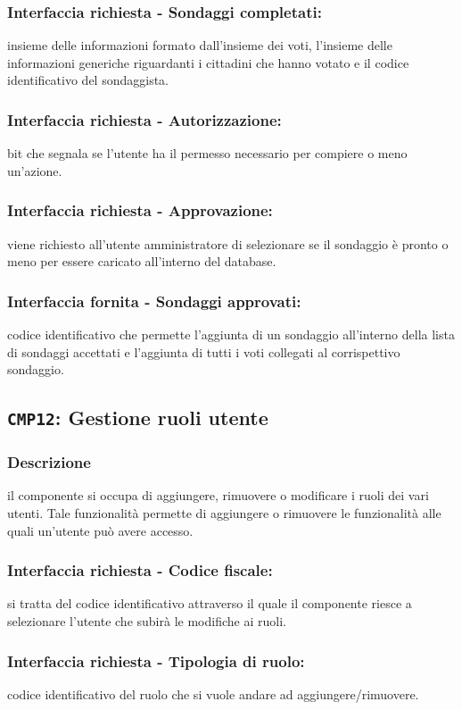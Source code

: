         \subsubsection{Interfaccia richiesta - Sondaggi completati:}
            insieme delle informazioni formato dall'insieme dei voti, l'insieme delle informazioni generiche riguardanti i cittadini che hanno votato e il codice identificativo del sondaggista.
        \subsubsection{Interfaccia richiesta - Autorizzazione:}
            bit che segnala se l'utente ha il permesso necessario per compiere o meno un'azione.
        \subsubsection{Interfaccia richiesta - Approvazione:}
            viene richiesto all'utente amministratore di selezionare se il sondaggio è pronto o meno per essere caricato all'interno del database.
        \subsubsection{Interfaccia fornita - Sondaggi approvati:}
            codice identificativo che permette l'aggiunta di un sondaggio all'interno della lista di sondaggi accettati e l'aggiunta di tutti i voti collegati al corrispettivo sondaggio.
    
    \subsection{\texttt{CMP12}: Gestione ruoli utente}
        \subsubsection{Descrizione}
            il componente si occupa di aggiungere, rimuovere o modificare i ruoli dei vari utenti. Tale funzionalità permette di aggiungere o rimuovere le funzionalità alle quali un'utente può avere accesso. 
        \subsubsection{Interfaccia richiesta - Codice fiscale:}
            si tratta del codice identificativo attraverso il quale il componente riesce a selezionare l'utente che subirà le modifiche ai ruoli.
        \subsubsection{Interfaccia richiesta - Tipologia di ruolo:}
            codice identificativo del ruolo che si vuole andare ad aggiungere/rimuovere.
